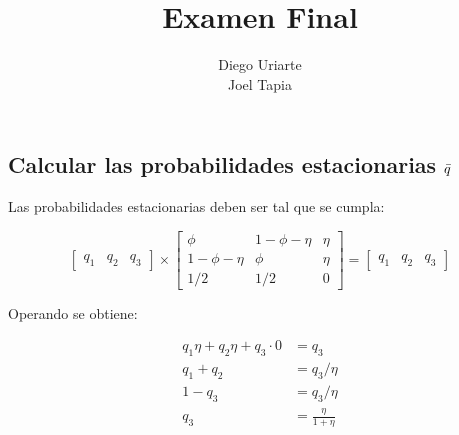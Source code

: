 \documentclass[12pt]{article}
\begin{document}
 

\title{Examen Final}%
\author{Diego Uriarte\\ %
Joel Tapia} %
 
\maketitle

\section{}

\subsection{Calcular las probabilidades estacionarias $\Bar{q}$}

Las probabilidades estacionarias deben ser tal que se cumpla:

\begin{equation*}
    \begin{bmatrix}
        q_1 & q_2 & q_3
    \end{bmatrix} \times 
    \begin{bmatrix}
        \phi                &   1 - \phi - \eta & \eta \\
        1 - \phi - \eta     &  \phi             & \eta \\
        1/2                 &  1/2              & 0
    \end{bmatrix} =
     \begin{bmatrix}
        q_1 & q_2 & q_3
    \end{bmatrix}
\end{equation*}

Operando se obtiene:

\begin{align*}
    q_1 \eta + q_2 \eta  + q_3 \cdot 0 &= q_3    \\
                            q_1 + q_2 &= q_3 / \eta \\
                            1 - q_3 & = q_3 / \eta \\
                            q_3 &= \frac{\eta}{1+\eta}
\end{align*}
\end{document}
